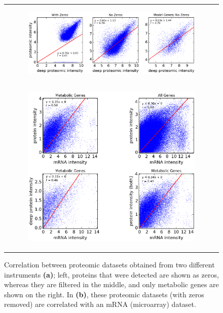 \begin{figure}[!htb]
\begin{tabular}{c}
  \begin{subfigure}[b]{0.95\textwidth}
  \includegraphics[width=\textwidth]{prot_DeepProt_correlation}
  \caption{} \label{fig:HumanExpCorr:A}
  \end{subfigure}
\\
  \begin{subfigure}[b]{0.91\textwidth}
  \includegraphics[width=\textwidth]{mRNA_protein_correlation}
  \caption{} \label{fig:HumanExpCorr:B}
  \end{subfigure} 
\\
\end{tabular}
\caption{Correlation between proteomic datasets obtained from two different
instruments \textbf{(a)}; 
left, proteins that were detected are shown as zeros, whereas they are filtered 
in the middle, and only metabolic genes are shown on the right. In \textbf{(b)},
these proteomic datasets (with zeros removed) are correlated with an 
mRNA (microarray) dataset.}
\label{fig:HumanExpCorr}
\end{figure}
\FloatBarrier

